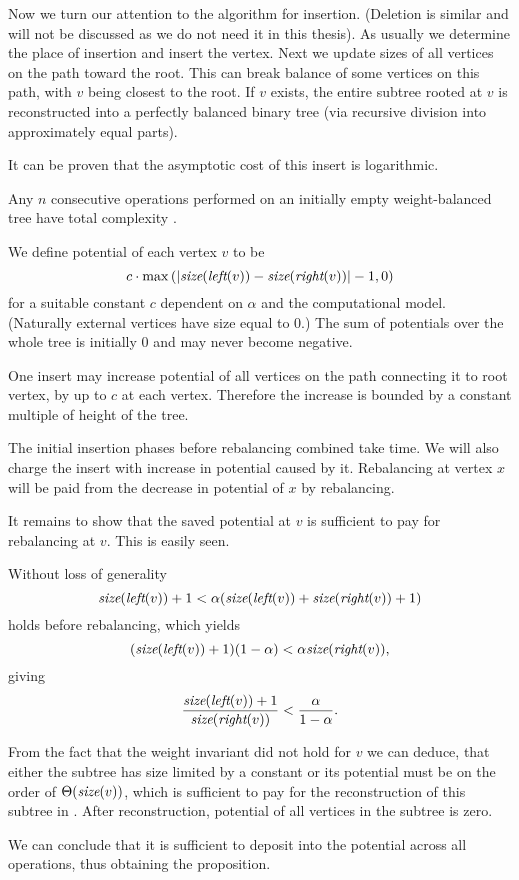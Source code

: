 Now we turn our attention to the algorithm for insertion. (Deletion is similar and will not be discussed as we do not need it in this thesis). As usually we determine the place of insertion and insert the vertex. Next we update sizes of all vertices on the path toward the root. This can break balance of some vertices on this path, with $v$ being closest to the root. If $v$ exists, the entire subtree rooted at $v$ is reconstructed into a perfectly balanced binary tree (via recursive division into approximately equal parts).

It can be proven that the asymptotic cost of this insert is logarithmic.

\begin{prop}
Any $n$ consecutive operations performed on an initially empty weight-balanced tree have total complexity . 
\end{prop}

\begin{myproof}
We define potential of each vertex $v$ to be $$c \cdot \max\left(|\text{\it size}(\text{\it left}(v)) - \text{\it size}(\text{\it right}(v))| - 1, 0\right)$$ for a suitable constant $c$ dependent on $\alpha$ and the computational model. (Naturally external vertices have size equal to 0.) The sum of potentials over the whole tree is initially 0 and may never become negative.

One insert may increase potential of all vertices on the path connecting it to root vertex, by up to $c$ at each vertex. Therefore the increase is bounded by a constant multiple of height of the tree.

The initial insertion phases before rebalancing combined take  time. We will also charge the insert with increase in potential caused by it. Rebalancing at vertex $x$ will be paid from the decrease in potential of $x$ by rebalancing. 

It remains to show that the saved potential at $v$ is sufficient to pay for rebalancing at $v$. This is easily seen. 

Without loss of generality
$$ \text{\it size}(\text{\it left}(v)) + 1 < \alpha ( \text{\it size}(\text{\it left}(v)) + \text{\it size}(\text{\it right}(v)) + 1 ) $$
holds before rebalancing, which yields
$$ (\text{\it size}(\text{\it left}(v)) + 1)(1 - \alpha) < \alpha \text{\it size}(\text{\it right}(v)), $$
giving
$$ { \text{\it size}(\text{\it left}(v)) + 1 \over \text{\it size}(\text{\it right}(v)) } < { \alpha \over 1 - \alpha }. $$

From the fact that the weight invariant did not hold for $v$ we can deduce, that either the subtree has size limited by a constant or its potential must be on the order of $\Theta(\text{\it size}(v))$, which is sufficient to pay for the reconstruction of this subtree in . After reconstruction, potential of all vertices in the subtree is zero.

We can conclude that it is sufficient to deposit  into the potential across all operations, thus obtaining the proposition.
\end{myproof}
